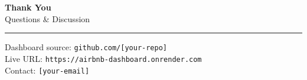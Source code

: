 \documentclass[aspectratio=169]{beamer}
\begin{document}
\begin{frame}
  \begin{center}
    \vspace{20pt}
    {\Huge\color{AirRed}\textbf{Thank You}}\\[16pt]
    {\large Questions \& Discussion}\\[20pt]
    \hrule\vspace{10pt}
    \small
    Dashboard source: \texttt{github.com/[your-repo]}\\
    Live URL: \texttt{https://airbnb-dashboard.onrender.com}\\
    Contact: \texttt{[your-email]}
  \end{center}
\end{frame}
\end{document}
